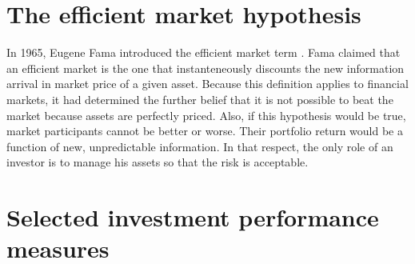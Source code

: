 \documentclass{pracamgr_wne}\usepackage[]{graphicx}\usepackage[]{color}
\begin{document}
\section{The efficient market hypothesis}

In 1965, Eugene Fama introduced the efficient market term \cite{Fama1965}. Fama claimed that an efficient market is the one that instanteneously discounts the new information arrival in market price of a given asset. Because this definition applies to financial markets, it had determined the further belief that it is not possible to beat the market because assets are perfectly priced. Also, if this hypothesis would be true, market participants cannot be better or worse. Their portfolio return would be a function of new, unpredictable information. In that respect, the only role of an investor is to manage his assets so that the risk is acceptable. 





\section{Selected investment performance measures}
\end{document}
